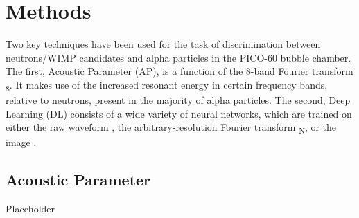 \documentclass[12pt]{article}
\begin{document}
\section{Methods}

Two key techniques have been used for the task of discrimination between neutrons/WIMP candidates and alpha particles in the PICO-60 bubble chamber. The first, Acoustic Parameter (AP), is a function of the 8-band Fourier transform \textbeta \textsubscript{8}. It makes use of the increased resonant energy in certain frequency bands, relative to neutrons, present in the majority of alpha particles. The second, Deep Learning (DL) consists of a wide variety of neural networks, which are trained on either the raw waveform \textomega{}, the arbitrary-resolution Fourier transform \textbeta \textsubscript{N}, or the image \textiota.

\subsection{Acoustic Parameter}
Placeholder
\end{document}
